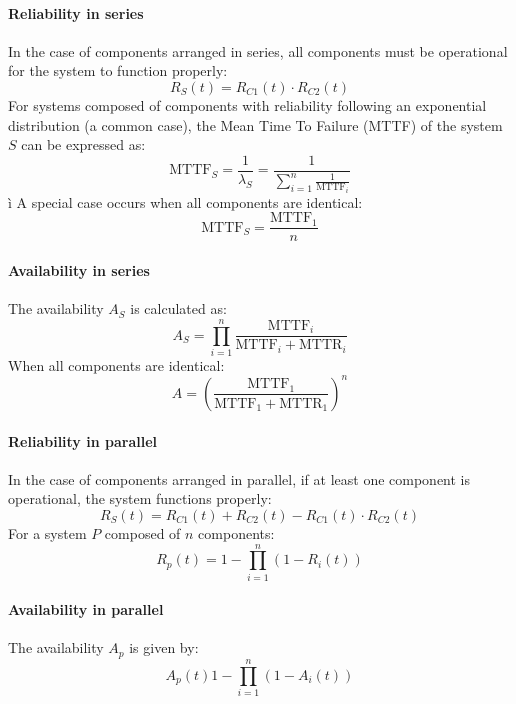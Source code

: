 \paragraph*{Reliability in series}
In the case of components arranged in series, all components must be operational for the system to function properly:
\[R_S(t)=R_{C1}(t)\cdot R_{C2}(t)\]
For systems composed of components with reliability following an exponential distribution (a common case), the Mean Time To Failure (MTTF) of the system $S$ can be expressed as:
\[\text{MTTF}_S=\dfrac{1}{\lambda_S}=\dfrac{1}{\sum_{i=1}^{n}\frac{1}{\text{MTTF}_i}}\]ì
A special case occurs when all components are identical:
\[\text{MTTF}_S=\dfrac{\text{MTTF}_1}{n}\]
\paragraph*{Availability in series}
The availability $A_S$ is calculated as:
\[A_S=\prod_{i=1}^{n}\dfrac{\text{MTTF}_i}{\text{MTTF}_i+\text{MTTR}_i}\]
When all components are identical:
\[A=\left( \dfrac{\text{MTTF}_1}{\text{MTTF}_1+\text{MTTR}_1} \right)^n\]
\paragraph*{Reliability in parallel}
In the case of components arranged in parallel, if at least one component is operational, the system functions properly:
\[R_S(t)=R_{C1}(t)+R_{C2}(t)-R_{C1}(t)\cdot R_{C2}(t)\]
For a system $P$ composed of $n$ components: 
\[R_p(t)=1-\prod_{i=1}^{n}\left( 1-R_i(t) \right)\]
\paragraph*{Availability in parallel}
The availability $A_p$ is given by:
\[A_p(t)1-\prod_{i=1}^{n}\left(1-A_i(t)\right)\]

